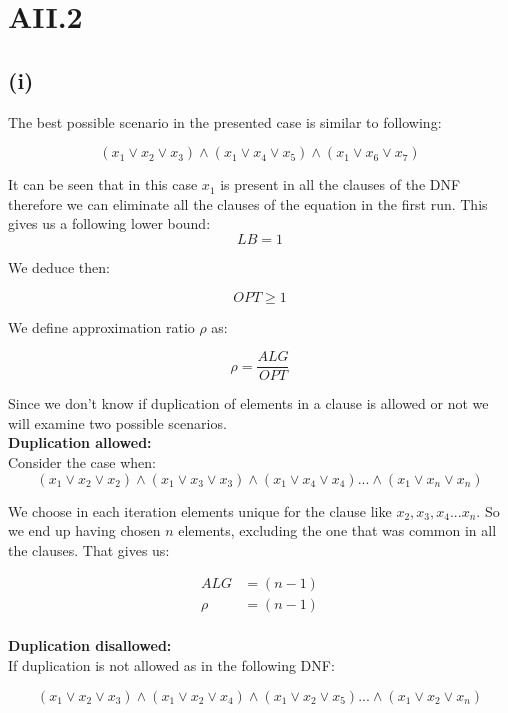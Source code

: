 \section* {AII.2}
\label {a2-2}
\subsection*{(i)}

The best possible scenario in the presented case is similar to following:

$$ (x_1 \vee x_2  \vee x_3) \wedge (x_1 \vee x_4 \vee x_5) \wedge (x_1 \vee x_6 \vee x_7) $$

It can be seen that in this case $ x_1 $ is present in all the clauses of the DNF therefore we can eliminate all the clauses of the equation in the first run. This gives us a following lower bound:
$$ LB = 1 $$ 

We deduce then:

$$ OPT \ge 1 $$

We define approximation ratio $ \rho $ as:

$$ \rho = \frac{ALG}{OPT} $$

Since we don't know if duplication of elements in a clause is allowed or not we will examine two possible scenarios.\\

\textbf{Duplication allowed:}\\

Consider the case when:\\

$$ (x_1 \vee x_2  \vee x_2) \wedge (x_1 \vee x_3 \vee x_3) \wedge (x_1 \vee x_4 \vee x_4) ... \wedge (x_1 \vee x_n \vee x_n) $$

We choose in each iteration elements unique for the clause like $ x_2 , x_3 , x_4 ... x_n $. So we end up having chosen $ n $ elements, excluding the one that was common in all the clauses. That gives us:

\begin{align*}
	ALG &= (n-1)\\
	\rho &= (n-1) \\
\end{align*}

\textbf{Duplication disallowed:}\\

If duplication is not allowed as in the following DNF:

$$ (x_1 \vee x_2  \vee x_3) \wedge (x_1 \vee x_2 \vee x_4) \wedge (x_1 \vee x_2 \vee x_5) ... \wedge (x_1 \vee x_2 \vee x_n) $$

